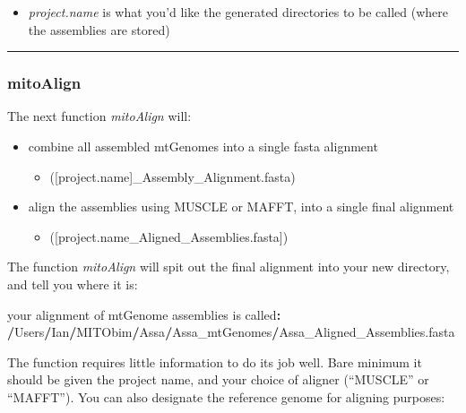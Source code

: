\documentclass[
]{article}
\newenvironment{Shaded}{\begin{snugshade}}{\end{snugshade}}
\newcommand{\ErrorTok}[1]{\textcolor[rgb]{0.64,0.00,0.00}{\textbf{#1}}}
\newcommand{\NormalTok}[1]{#1}
\newcommand{\OperatorTok}[1]{\textcolor[rgb]{0.81,0.36,0.00}{\textbf{#1}}}
\newcommand{\StringTok}[1]{\textcolor[rgb]{0.31,0.60,0.02}{#1}}
\providecommand{\tightlist}{%
  \setlength{\itemsep}{0pt}\setlength{\parskip}{0pt}}
\begin{document}
\begin{itemize}
\tightlist
\item
  \emph{project.name} is what you'd like the generated directories to be
  called (where the assemblies are stored)
\end{itemize}

\begin{center}\rule{0.5\linewidth}{0.5pt}\end{center}

\hypertarget{mitoalign}{%
\subsubsection{mitoAlign}\label{mitoalign}}

The next function \emph{mitoAlign} will:

\begin{itemize}
\tightlist
\item
  combine all assembled mtGenomes into a single fasta alignment

  \begin{itemize}
  \tightlist
  \item
    ({[}project.name{]}\_Assembly\_Alignment.fasta)\\
  \end{itemize}
\item
  align the assemblies using MUSCLE or MAFFT, into a single final
  alignment

  \begin{itemize}
  \tightlist
  \item
    ({[}project.name\_Aligned\_Assemblies.fasta{]})
  \end{itemize}
\end{itemize}

The function \emph{mitoAlign} will spit out the final alignment into
your new directory, and tell you where it is:

\begin{Shaded}
\begin{Highlighting}[]
\NormalTok{your alignment of mtGenome assemblies is called}\OperatorTok{:}
\StringTok{  }\ErrorTok{/}\NormalTok{Users}\OperatorTok{/}\NormalTok{Ian}\OperatorTok{/}\NormalTok{MITObim}\OperatorTok{/}\NormalTok{Assa}\OperatorTok{/}\NormalTok{Assa\_mtGenomes}\OperatorTok{/}\NormalTok{Assa\_Aligned\_Assemblies.fasta}
\end{Highlighting}
\end{Shaded}

The function requires little information to do its job well. Bare
minimum it should be given the project name, and your choice of aligner
(``MUSCLE'' or ``MAFFT''). You can also designate the reference genome
for aligning purposes:
\end{document}
